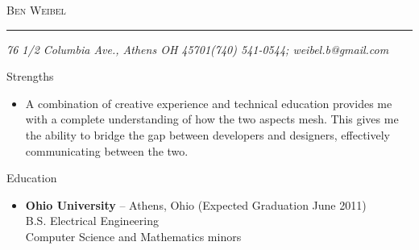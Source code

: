 \documentclass[11pt,oneside]{article}
\makeatletter
\newcommand{\name}{Ben Weibel}
\newcommand{\addr}{76 1/2 Columbia Ave., Athens OH 45701}
\newcommand{\phone}{(740) 541-0544}
\newcommand{\email}{weibel.b@gmail.com}
\newcommand{\bigname}[1]{
	\begin{center}\fontfamily{phv}\selectfont\Huge\scshape#1\end{center}
}
\newenvironment{ressection}[1]{
	\vspace{4pt}
	{\fontfamily{phv}\selectfont\Large#1}
	\begin{itemize}
	\vspace{3pt}
}{
	\end{itemize}
}
\newcommand{\ressubitem}[1]{
	\vspace{-1pt}
	\item \begin{flushleft} #1 \end{flushleft}
}
\makeatother
\begin{document}
 \selectfont

\bigname{\name}

\vspace{-8pt} \rule{\textwidth}{1pt}

\vspace{-1pt} {\small\itshape \addr \hfill \phone; \email}

\vspace{8 pt}



\begin{ressection}{Strengths}
\ressubitem{A combination of creative experience and technical education provides me with a complete understanding of how the two aspects mesh. This gives me the ability to bridge the gap between developers and designers, effectively communicating between the two.}
\end{ressection}


\begin{ressection}{Education}

\ressubitem{\textbf{Ohio University} -- Athens, Ohio (Expected Graduation June 2011)\\B.S. Electrical Engineering \\Computer Science and Mathematics minors}


\end{ressection}
\end{document}
